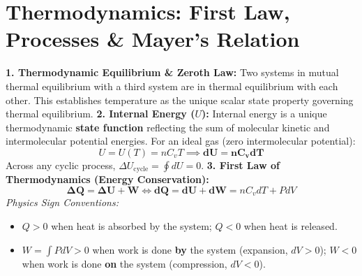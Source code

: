 \documentclass[10pt,twoside,openright]{book}
\begin{document}
\section{Thermodynamics: First Law, Processes \& Mayer's Relation}

\begin{conceptbox}
\textbf{1. Thermodynamic Equilibrium \& Zeroth Law:}
Two systems in mutual thermal equilibrium with a third system are in thermal equilibrium with each other. This establishes temperature as the unique scalar state property governing thermal equilibrium.
\textbf{2. Internal Energy ($U$):}
Internal energy is a unique thermodynamic \textbf{state function} reflecting the sum of molecular kinetic and intermolecular potential energies. For an ideal gas (zero intermolecular potential):
\begin{equation}
  U = U(T) = n C_v T \implies \mathbf{dU = n C_v dT}
\end{equation}
Across any cyclic process, $\Delta U_{\text{cycle}} = \oint dU = 0$.
\textbf{3. First Law of Thermodynamics (Energy Conservation):}
\begin{equation}
  \mathbf{\Delta Q = \Delta U + W} \iff \mathbf{dQ = dU + dW} = n C_v dT + P dV
\end{equation}
\textit{Physics Sign Conventions:}
\begin{itemize}
  \item $Q > 0$ when heat is absorbed by the system; $Q < 0$ when heat is released.
  \item $W = \int P dV > 0$ when work is done \textbf{by} the system (expansion, $dV > 0$); $W < 0$ when work is done \textbf{on} the system (compression, $dV < 0$).
\end{itemize}
\end{conceptbox}
\end{document}
